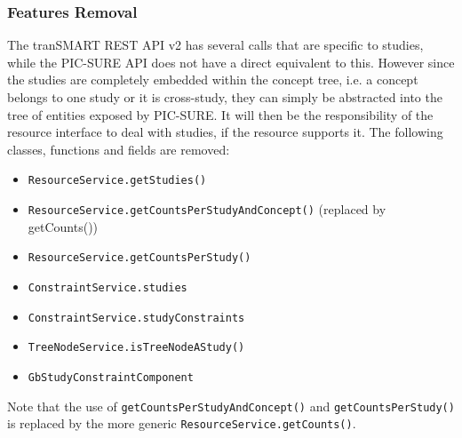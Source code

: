 \subsubsection{Features Removal}

The tranSMART REST API v2 has several calls that are specific to studies, while the PIC-SURE API does not have a direct equivalent to this.
However since the studies are completely embedded within the concept tree, i.e. a concept belongs to one study or it is cross-study, they can simply be abstracted into the tree of entities exposed by PIC-SURE.
It will then be the responsibility of the resource interface to deal with studies, if the resource supports it.
The following classes, functions and fields are removed:
\begin{itemize}
    \item \verb|ResourceService.getStudies()| %
    \item \verb|ResourceService.getCountsPerStudyAndConcept()| (replaced by getCounts())
    \item \verb|ResourceService.getCountsPerStudy()|
    \item \verb|ConstraintService.studies| %
    \item \verb|ConstraintService.studyConstraints| %
    \item \verb|TreeNodeService.isTreeNodeAStudy()| %
    \item \verb|GbStudyConstraintComponent| %
\end{itemize}

Note that the use of \verb|getCountsPerStudyAndConcept()| and \verb|getCountsPerStudy()| is replaced by the more generic \verb|ResourceService.getCounts()|.



